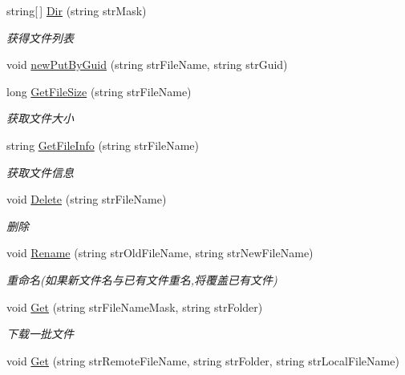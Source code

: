 \begin{DoxyCompactItemize}
string\mbox{[}$\,$\mbox{]} \hyperlink{class_x_c_l_net_tools_1_1_f_t_p_1_1_f_t_p_client_a9563c1fa35e755073b9b279caaf7e354}{Dir} (string str\-Mask)
\begin{DoxyCompactList}\small\item\em 获得文件列表 \end{DoxyCompactList}\item 
void \hyperlink{class_x_c_l_net_tools_1_1_f_t_p_1_1_f_t_p_client_a502eb52b0575947170695c4fcbccc10a}{new\-Put\-By\-Guid} (string str\-File\-Name, string str\-Guid)
\item 
long \hyperlink{class_x_c_l_net_tools_1_1_f_t_p_1_1_f_t_p_client_a39be7d18214835a62484226fc12e2061}{Get\-File\-Size} (string str\-File\-Name)
\begin{DoxyCompactList}\small\item\em 获取文件大小 \end{DoxyCompactList}\item 
string \hyperlink{class_x_c_l_net_tools_1_1_f_t_p_1_1_f_t_p_client_abcdeced5a90923ad5788251d4012694f}{Get\-File\-Info} (string str\-File\-Name)
\begin{DoxyCompactList}\small\item\em 获取文件信息 \end{DoxyCompactList}\item 
void \hyperlink{class_x_c_l_net_tools_1_1_f_t_p_1_1_f_t_p_client_a1be296574d7342283c236d8b51ca2b04}{Delete} (string str\-File\-Name)
\begin{DoxyCompactList}\small\item\em 删除 \end{DoxyCompactList}\item 
void \hyperlink{class_x_c_l_net_tools_1_1_f_t_p_1_1_f_t_p_client_aaadb1ae86c64e8ec958e8333fc6b9bce}{Rename} (string str\-Old\-File\-Name, string str\-New\-File\-Name)
\begin{DoxyCompactList}\small\item\em 重命名(如果新文件名与已有文件重名,将覆盖已有文件) \end{DoxyCompactList}\item 
void \hyperlink{class_x_c_l_net_tools_1_1_f_t_p_1_1_f_t_p_client_a67852a51f561336c777b896af2e95990}{Get} (string str\-File\-Name\-Mask, string str\-Folder)
\begin{DoxyCompactList}\small\item\em 下载一批文件 \end{DoxyCompactList}\item 
void \hyperlink{class_x_c_l_net_tools_1_1_f_t_p_1_1_f_t_p_client_a87ce6305af9ccb5e04b0669bd0eac812}{Get} (string str\-Remote\-File\-Name, string str\-Folder, string str\-Local\-File\-Name)

\end{DoxyCompactItemize}
